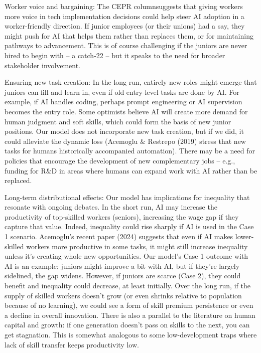 \documentclass[12pt]{article}
\begin{document}
{{Worker voice and bargaining}: The CEPR columnsuggests that
giving workers more voice in tech implementation decisions could
help steer AI adoption in a worker-friendly direction. If junior
employees (or their unions) had a say, they might push for AI that
{helps them} rather than replaces them, or for maintaining
pathways to advancement. This is of course challenging if the
juniors are never hired to begin with -- a catch-22 -- but it speaks
to the need for broader stakeholder involvement.

{Ensuring new task creation}: In the long run, entirely new
roles might emerge that juniors can fill and learn in, even if old
entry-level tasks are done by AI. For example, if AI handles coding,
perhaps {prompt engineering} or {AI supervision} becomes
the entry role. Some optimists believe AI will create more demand
for human judgment and soft skills, which could form the basis of
new junior positions. Our model does not incorporate new task
creation, but if we did, it could alleviate the dynamic loss
(Acemoglu \& Restrepo (2019) stress that new tasks for humans
historically accompanied automation). There may be a need for
{policies that encourage the development of new complementary
jobs} -- e.g., funding for R\&D in areas where humans can expand
work with AI rather than be replaced.

{Long-term distributional effects:} Our model has implications
for inequality that resonate with ongoing debates. In the short run,
AI may increase the productivity of top-skilled workers (seniors),
increasing the wage gap if they capture that value. Indeed,
{inequality could rise sharply} if AI is used in the Case 1
scenario. Acemoglu's recent paper (2024) suggests that even if AI
makes lower-skilled workers more productive in some tasks, it might
{still} increase inequality unless it's creating whole new
opportunities. Our model's Case 1 outcome with AI is an example:
juniors might improve a bit with AI, but if they're largely sidelined,
the gap widens. However, if juniors are scarce (Case 2), they could
benefit and inequality could decrease, at least initially. Over the
long run, if the supply of skilled workers doesn't grow (or even
shrinks relative to population because of no learning), we could see a
form of {skill premium persistence} or even a decline in
overall innovation. There is also a parallel to the literature on
{human capital and growth}: if one generation doesn't pass on
skills to the next, you can get stagnation. This is somewhat analogous
to some low-development traps where lack of skill transfer keeps
productivity low.

}
\end{document}
